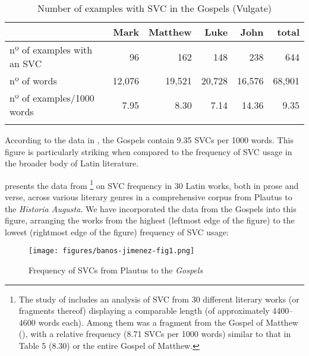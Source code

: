 \documentclass[output=paper,colorlinks,citecolor=brown]{langscibook}
\begin{document}
\begin{table}
  \caption{Number of examples with SVC in the Gospels (Vulgate)}
  \label{tbl:bj:vultate}
\centering
\small
\begin{tabularx}{\textwidth}{Xrrrrr}
\lsptoprule
 & Mark & Matthew & Luke & John & total\\
\midrule
nº of examples with an SVC & 96 & 162 & 148 & 238 & 644\\
nº of words & 12,076 & 19,521 & 20,728 & 16,576 & 68,901\\
nº of examples/1000 words & 7.95 & 8.30 & 7.14 & 14.36 & 9.35\\
\lspbottomrule
\end{tabularx}
\end{table}


According to the data in , the Gospels contain 9.35 SVCs per
1000 words. This figure is particularly striking when compared to the frequency of SVC
usage in the broader body of Latin literature.

 presents the data from
\citet{BañosJoséMiguel-2023295}\footnote{The study of \citet{BañosJoséMiguel-2023295}
  includes an analysis of SVC from 30 different literary works (or fragments thereof)
  displaying a comparable length (of approximately 4400--4600 words each). Among them was a
  fragment from the Gospel of Matthew (), with a relative frequency (8.71 SVCs per
  1000 words) similar to that in Table 5 (8.30) or the entire Gospel of Matthew.} on SVC
frequency in 30 Latin works, both in prose and verse, across various literary genres in a
comprehensive corpus from Plautus to the \emph{Historia Augusta}. We have incorporated the
data from the Gospels into this figure, arranging the works from the highest (leftmost edge of the figure) to the lowest (rightmost edge of the figure)
frequency of SVC usage:

\begin{figure}
  \centering
  \texttt{[image: figures/banos-jimenez-fig1.png]}
  \caption{Frequency of SVCs from Plautus to the \emph{Gospels}}
  \label{fig:bj:graph}
\end{figure}
\end{document}
